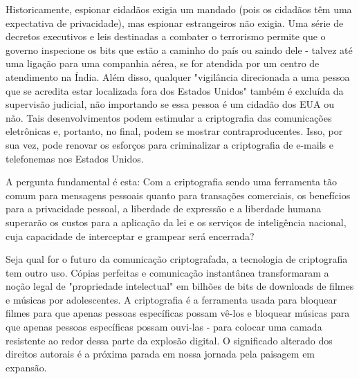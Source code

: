 \documentclass{book}
\begin{document}
Historicamente, espionar cidadãos exigia um mandado (pois os cidadãos têm uma expectativa de privacidade), mas espionar estrangeiros não exigia. Uma série de decretos executivos e leis destinadas a combater o terrorismo permite que o governo inspecione os bits que estão a caminho do país ou saindo dele - talvez até uma ligação para uma companhia aérea, se for atendida por um centro de atendimento na Índia. Além disso, qualquer "vigilância direcionada a uma pessoa que se acredita estar localizada fora dos Estados Unidos" também é excluída da supervisão judicial, não importando se essa pessoa é um cidadão dos EUA ou não. Tais desenvolvimentos podem estimular a criptografia das comunicações eletrônicas e, portanto, no final, podem se mostrar contraproducentes. Isso, por sua vez, pode renovar os esforços para criminalizar a criptografia de e-mails e telefonemas nos Estados Unidos.

A pergunta fundamental é esta: Com a criptografia sendo uma ferramenta tão comum para mensagens pessoais quanto para transações comerciais, os benefícios para a privacidade pessoal, a liberdade de expressão e a liberdade humana superarão os custos para a aplicação da lei e os serviços de inteligência nacional, cuja capacidade de interceptar e grampear será encerrada?

Seja qual for o futuro da comunicação criptografada, a tecnologia de criptografia tem outro uso. Cópias perfeitas e comunicação instantânea transformaram a noção legal de "propriedade intelectual" em bilhões de bits de downloads de filmes e músicas por adolescentes. A criptografia é a ferramenta usada para bloquear filmes para que apenas pessoas específicas possam vê-los e bloquear músicas para que apenas pessoas específicas possam ouvi-las - para colocar uma camada resistente ao redor dessa parte da explosão digital. O significado alterado dos direitos autorais é a próxima parada em nossa jornada pela paisagem em expansão.
\end{document}
